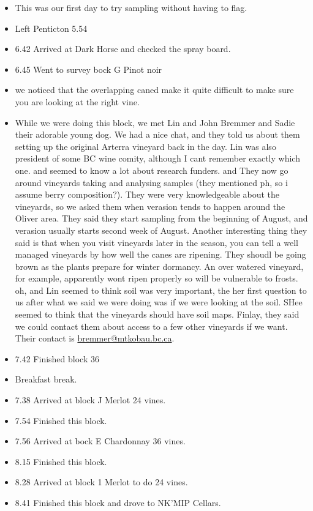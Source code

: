 \documentclass[11pt,letter]{article}
\newenvironment{smitemize}{
\begin{itemize}
  \setlength{\itemsep}{0pt}
  \setlength{\parskip}{0.8pt}
  \setlength{\parsep}{0pt}}
{\end{itemize}
}
\begin{document}
\begin{smitemize}
\item This was our first day to try sampling without having to flag. 
\item Left Penticton 5.54 
\item 6.42 Arrived at Dark Horse and checked the spray board.
\item 6.45 Went to survey bock G Pinot noir
\item we noticed that the overlapping caned make it quite difficult to make sure you are looking at the right vine.
\item While we were doing this block, we met Lin and John Bremmer and Sadie their adorable young dog. We had a nice chat, and they told us about them setting up the original Arterra vineyard back in the day. Lin was also president of some BC wine comity, although I cant remember exactly which one. and seemed to know a lot about research funders. and They now go around vineyards taking and analysing samples (they mentioned ph, so i assume berry composition?). They were very knowledgeable about the vineyards, so we asked them when verasion tends to happen around the Oliver area. They said they start sampling from the beginning of August, and verasion usually starts second week of August. Another interesting thing they said is that when you visit vineyards later in the season, you can tell a well managed vineyards by how well the canes are ripening. They shoudl be going brown as the plants prepare for winter dormancy. An over watered vineyard, for example, apparently wont ripen properly so will be vulnerable to frosts. oh, and Lin seemed to think soil was very important, the her first question to us after what we said we were doing was if we were looking at the soil. SHee seemed to think that the vineyards should have soil maps. Finlay, they said we could contact them about access to a few other vineyards if we want. Their contact is  \href{mailto:bremmer@mtkobau.bc.ca}{bremmer@mtkobau.bc.ca}.
\item 7.42 Finished block 36
\item Breakfast break.
\item 7.38 Arrived at block J Merlot 24 vines.
\item 7.54 Finished this block. 
\item 7.56 Arrived at bock E Chardonnay 36 vines.
\item 8.15 Finished this block. 
\item 8.28 Arrived at block 1 Merlot to do 24 vines. 
\item 8.41 Finished this block and drove to NK'MIP Cellars.

\end{smitemize}
\end{document}
